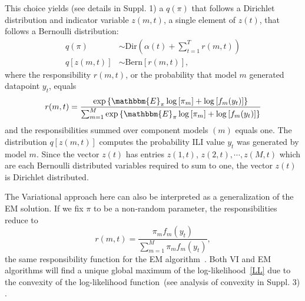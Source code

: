 \documentclass[sagev,times,Review,10pt]{sagej}
\def\l{\left}
\def\r{\right}
\begin{document}
This choice yields (see details in Suppl. 1) %
a $q(\pi)$ that follows a Dirichlet distribution and indicator variable $z(m,t)$, a single element of $z(t)$, that follows a Bernoulli distribution:
\begin{align}
    q(\pi)  &\sim \mathrm{Dir}\l( \alpha(t) + \sum_{t=1}^{T}  r(m,t)  \r) \label{dirSol}\\
   q\l[z(m,t)\r] &\sim \mathrm{Bern}\l[ r(m,t) \r],
\end{align}
where the responsibility $r(m,t)$, or the probability that model $m$ generated datapoint $y_{t}$, equals
\begin{equation}
  r(m,t) = \dfrac{ \exp \l \{ \mathbbm{E}_{\pi} \log \l[ \pi_m \r] + \log \l[ f_{m}(y_{t}) \r] \r \} } {\sum_{m=1}^{M} \exp \l \{ \mathbbm{E}_{\pi} \log \l[ \pi_m \r] + \log \l[ f_{m}(y_{t}) \r] \r \}}
\end{equation}
and the responsibilities summed over component models $(m)$ equals one.
The distribution $q\l[z(m,t)\r]$ computes the probability ILI value $y_{t}$ was generated by model $m$.
Since the vector $z(t)$ has entries $z(1,t)$, $z(2,t), \cdots, z(M,t)$ which are each Bernoulli distributed variables required to sum to one, the vector $z(t)$ is Dirichlet distributed. 


The Variational approach here can also be interpreted as a generalization of the EM solution.
If we fix $\pi$ to be a non-random parameter, the responsibilities reduce to
\begin{equation}
  r(m,t) = \dfrac{\pi_mf_{m}(y_{t})}{\sum_{m=1}^{M} \pi_mf_{m}(y_{t}) },
\end{equation}
the same responsibility function for the EM algorithm~\citep{reich2019collaborativepnas}.
Both VI and EM algorithms will find a unique global maximum of the log-likelihood~\eqref{LL} due to the convexity of the log-likelihood function~(see analysis of convexity in Suppl. 3) .%
\end{document}
